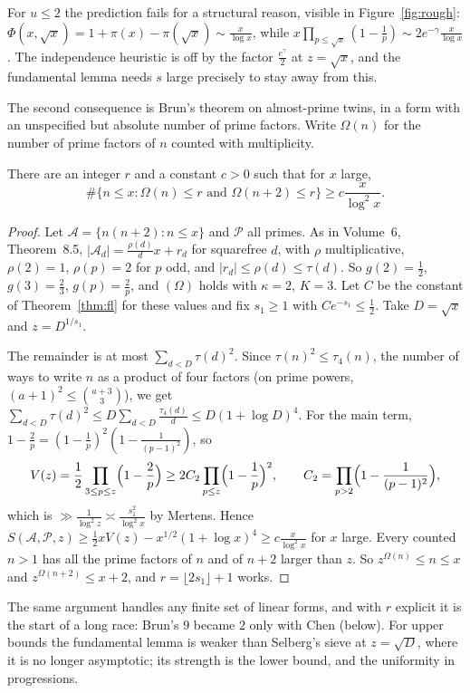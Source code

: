 For $u\le2$ the prediction fails for a structural reason, visible in Figure~\ref{fig:rough}: $\Phi(x,\sqrt x)=1+\pi(x)-\pi(\sqrt x)\sim\frac x{\log x}$, while $x\prod_{p\le\sqrt x}(1-\frac1p)\sim2e^{-\gamma}\frac x{\log x}$. The independence heuristic is off by the factor $\frac{e^\gamma}2$ at $z=\sqrt x$, and the fundamental lemma needs $s$ large precisely to stay away from this.

The second consequence is Brun's theorem on almost-prime twins, in a form with an unspecified but absolute number of prime factors. Write $\Omega(n)$ for the number of prime factors of $n$ counted with multiplicity.

\begin{corollary}[Brun]\label{cor:brunalmost}
There are an integer $r$ and a constant $c>0$ such that for $x$ large,
\[
\#\{n\le x:\Omega(n)\le r\text{ and }\Omega(n+2)\le r\}\ge c\frac x{\log^2x}.
\]
\end{corollary}
\begin{proof}
Let $\mathcal A=\{n(n+2):n\le x\}$ and $\mathcal P$ all primes. As in Volume~6, Theorem~8.5, $|\mathcal A_d|=\frac{\rho(d)}dx+r_d$ for squarefree $d$, with $\rho$ multiplicative, $\rho(2)=1$, $\rho(p)=2$ for $p$ odd, and $|r_d|\le\rho(d)\le\tau(d)$. So $g(2)=\frac12$, $g(3)=\frac23$, $g(p)=\frac2p$, and $(\Omega)$ holds with $\kappa=2$, $K=3$. Let $C$ be the constant of Theorem~\ref{thm:fl} for these values and fix $s_1\ge1$ with $Ce^{-s_1}\le\frac12$. Take $D=\sqrt x$ and $z=D^{1/s_1}$.

The remainder is at most $\sum_{d<D}\tau(d)^2$. Since $\tau(n)^2\le\tau_4(n)$, the number of ways to write $n$ as a product of four factors (on prime powers, $(a+1)^2\le\binom{a+3}3$), we get $\sum_{d<D}\tau(d)^2\le D\sum_{d<D}\frac{\tau_4(d)}d\le D(1+\log D)^4$. For the main term, $1-\frac2p=(1-\frac1p)^2(1-\frac1{(p-1)^2})$, so
\[
V(z)=\frac12\prod_{3\le p\le z}\Bigl(1-\frac2p\Bigr)\ge2C_2\prod_{p\le z}\Bigl(1-\frac1p\Bigr)^2,\qquad C_2=\prod_{p>2}\Bigl(1-\frac1{(p-1)^2}\Bigr),
\]
which is $\gg\frac1{\log^2z}\asymp\frac{s_1^2}{\log^2x}$ by Mertens. Hence $S(\mathcal A,\mathcal P,z)\ge\frac12xV(z)-x^{1/2}(1+\log x)^4\ge c\frac x{\log^2x}$ for $x$ large.
Every counted $n>1$ has all the prime factors of $n$ and of $n+2$ larger than $z$. So $z^{\Omega(n)}\le n\le x$ and $z^{\Omega(n+2)}\le x+2$, and $r=\lfloor2s_1\rfloor+1$ works.
\end{proof}

The same argument handles any finite set of linear forms, and with $r$ explicit it is the start of a long race: Brun's $9$ became $2$ only with Chen (below). For upper bounds the fundamental lemma is weaker than Selberg's sieve at $z=\sqrt D$, where it is no longer asymptotic; its strength is the lower bound, and the uniformity in progressions.

